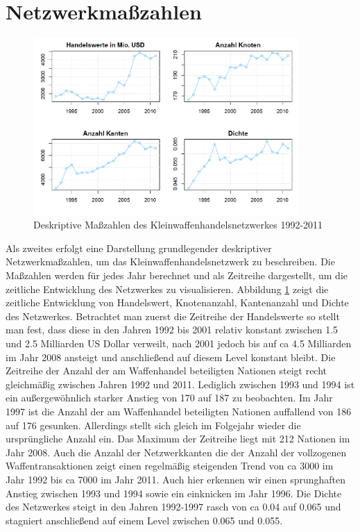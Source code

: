 \documentclass[a4paper,ngerman,oneside,titlepage,bibliography=totoc,11pt]{scrreprt}
\begin{document}
\section{Netzwerkmaßzahlen}
\begin{figure}[ht]
	\centering
		\includegraphics[width=0.9\textwidth]{Grafiken/ts_descriptives.png}
	\caption{Deskriptive Maßzahlen des Kleinwaffenhandelsnetzwerkes 1992-2011}
	\label{fig:ts_descriptives}
\end{figure}
Als zweites erfolgt eine Darstellung grundlegender deskriptiver Netzwerkmaßzahlen, um das Kleinwaffenhandelsnetzwerk zu beschreiben. Die Maßzahlen werden für jedes Jahr berechnet und als Zeitreihe dargestellt, um die zeitliche Entwicklung des Netzwerkes zu visualisieren. 
Abbildung \ref{fig:ts_descriptives} zeigt die zeitliche Entwicklung  von Handelswert, Knotenanzahl, Kantenanzahl und Dichte des Netzwerkes. Betrachtet man zuerst die Zeitreihe der Handelswerte so stellt man fest, dass diese in den Jahren 1992 bis 2001 relativ konstant zwischen 1.5 und 2.5 Milliarden US Dollar verweilt, nach 2001 jedoch bis auf ca 4.5 Milliarden im Jahr 2008 ansteigt und anschließend auf diesem Level konstant bleibt.
Die Zeitreihe der Anzahl der am Waffenhandel beteiligten Nationen steigt recht gleichmäßig zwischen Jahren 1992 und 2011. Lediglich zwischen 1993 und 1994 ist ein außergewöhnlich starker Anstieg von 170 auf 187 zu beobachten. Im Jahr 1997 ist die Anzahl der am Waffenhandel beteiligten Nationen auffallend von 186 auf 176 gesunken. Allerdings stellt sich gleich im Folgejahr wieder die ursprüngliche Anzahl ein. Das Maximum der Zeitreihe liegt mit 212 Nationen im Jahr 2008.
Auch die Anzahl der Netzwerkkanten die der Anzahl der vollzogenen Waffentransaktionen zeigt einen regelmäßig steigenden Trend von ca 3000 im Jahr 1992 bis ca 7000 im Jahr 2011. Auch hier erkennen wir einen sprunghaften Anstieg zwischen 1993 und 1994 sowie ein einknicken im Jahr 1996.
Die Dichte des Netzwerkes steigt in den Jahren 1992-1997 rasch von ca 0.04 auf 0.065 und stagniert anschließend auf einem Level zwischen 0.065 und 0.055.
\end{document}
